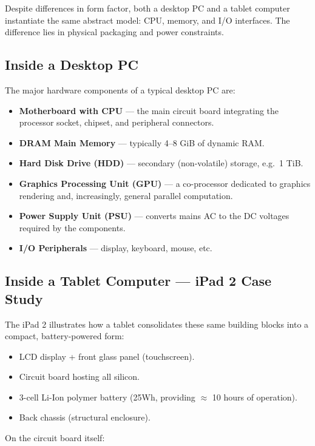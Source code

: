 \documentclass[11pt, a4paper, notitlepage]{report}
\theoremstyle{definition}
\theoremstyle{remark}
\theoremstyle{definition}
\begin{document}
Despite differences in form factor, both a desktop PC and a tablet computer instantiate the same abstract model: CPU, memory, and I/O interfaces. The difference lies in physical packaging and power constraints.

\subsection{Inside a Desktop PC}

The major hardware components of a typical desktop PC are:

\begin{itemize}
  \item \textbf{Motherboard with CPU} --- the main circuit board integrating the processor socket, chipset, and peripheral connectors.
  \item \textbf{DRAM Main Memory} --- typically 4--8 GiB of dynamic RAM.
  \item \textbf{Hard Disk Drive (HDD)} --- secondary (non-volatile) storage, e.g.\ 1 TiB.
  \item \textbf{Graphics Processing Unit (GPU)} --- a co-processor dedicated to graphics rendering and, increasingly, general parallel computation.
  \item \textbf{Power Supply Unit (PSU)} --- converts mains AC to the DC voltages required by the components.
  \item \textbf{I/O Peripherals} --- display, keyboard, mouse, etc.
\end{itemize}

\subsection{Inside a Tablet Computer --- iPad 2 Case Study}

The iPad 2 illustrates how a tablet consolidates these same building blocks into a compact, battery-powered form:

\begin{itemize}
  \item LCD display + front glass panel (touchscreen).
  \item Circuit board hosting all silicon.
  \item 3-cell Li-Ion polymer battery (25Wh, providing $\approx$ 10 hours of operation).
  \item Back chassis (structural enclosure).
\end{itemize}

On the circuit board itself:
\end{document}
